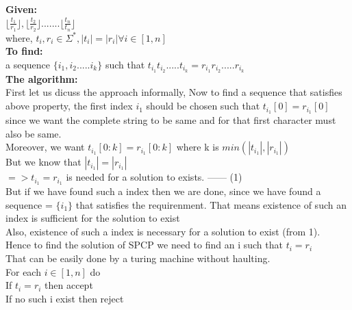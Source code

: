 \documentclass{article}
\begin{document}
\textbf{Given: }\\

$\lfloor \frac{t_1}{r_1} \rfloor , \lfloor \frac{t_2}{r_2} \rfloor ....... \lfloor \frac{t_n}{t_n} \rfloor$ \\
where, $t_i , r_i \in \Sigma^* , |t_i| = |r_i| \forall i \in [1,n]$\\

\textbf{To find: } \\
a sequence $\{ i_1,i_2.....i_k \}$ such that $t_{i_1}t_{i_2}.....t_{i_k} = r_{i_1}r_{i_2}.....r_{i_k}$\\

\textbf{The algorithm: }\\

First let us dicuss the approach informally, Now to find a sequence that satisfies above property, the first index $i_1$ should be chosen such that $t_{i_1}[0] = r_{i_1}[0]$ since we want the complete string to be same 
and for that first character must also be same.\\
Moreover, we want $t_{i_1}[0:k] = r_{i_1}[0:k]$ where k is $min(|t_{i_1}|,|r_{i_1}|)$\\
But we know that $|t_{i_1}| = |r_{i_1}|$\\
$ => t_{i_1} = r_{i_1}$ is needed for a solution to exists. ------ (1)\\
But if we have found such a index then we are done, since we have found a sequence = $\{i_1\}$  that satisfies the requirenment. That means existence of such an index is sufficient for the solution to exist\\
Also, existence of such a index is necessary for a solution to exist (from 1).\\
Hence to find the solution of SPCP we need to find an i such that $t_i = r_i$\\ That can be easily done by a turing machine without haulting.\\

For each $i \in [1,n]$ do\\
\hspace*{2cm} If $t_i = r_i$ then accept\\
\hspace*{0.5cm} If no such i exist then reject\\

\pagebreak
\end{document}
